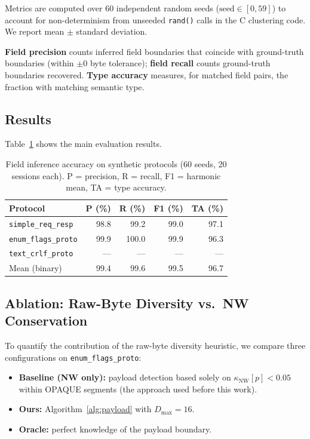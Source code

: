 \documentclass[letterpaper,twocolumn,10pt]{article}
\begin{document}
Metrics are computed over 60 independent random seeds ($\text{seed} \in
[0, 59]$) to account for non-determinism from unseeded \texttt{rand()} calls
in the C clustering code.  We report mean $\pm$ standard deviation.

\textbf{Field precision} counts inferred field boundaries that coincide with
ground-truth boundaries (within $\pm 0$ byte tolerance); \textbf{field recall}
counts ground-truth boundaries recovered.  \textbf{Type accuracy} measures, for
matched field pairs, the fraction with matching semantic type.

\subsection{Results}

Table~\ref{tab:main} shows the main evaluation results.

\begin{table}[t]
  \centering
  \caption{Field inference accuracy on synthetic protocols (60 seeds, 20
    sessions each).  P = precision, R = recall, F1 = harmonic mean,
    TA = type accuracy.}
  \label{tab:main}
  \begin{tabular}{lrrrr}
    \toprule
    Protocol & P (\%) & R (\%) & F1 (\%) & TA (\%) \\
    \midrule
    \texttt{simple\_req\_resp}   & 98.8 & 99.2 & 99.0 & 97.1 \\
    \texttt{enum\_flags\_proto}  & 99.9 & 100.0 & 99.9 & 96.3 \\
    \texttt{text\_crlf\_proto}   & ---  & ---   & ---  & ---  \\
    \midrule
    Mean (binary)                & 99.4 & 99.6 & 99.5 & 96.7 \\
    \bottomrule
  \end{tabular}
\end{table}

\subsection{Ablation: Raw-Byte Diversity vs.\ NW Conservation}

To quantify the contribution of the raw-byte diversity heuristic, we compare
three configurations on \texttt{enum\_flags\_proto}:

\begin{itemize}
  \item \textbf{Baseline (NW only):} payload detection based solely on
    $\kappa_\text{NW}[p] < 0.05$ within OPAQUE segments (the approach used
    before this work).
  \item \textbf{Ours:} Algorithm~\ref{alg:payload} with $D_\text{max} = 16$.
  \item \textbf{Oracle:} perfect knowledge of the payload boundary.
\end{itemize}
\end{document}
